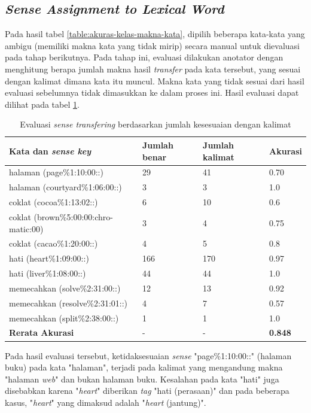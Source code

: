 \subsection{\textit{Sense Assignment to Lexical Word}}

Pada hasil tabel \ref{table:akuras-kelas-makna-kata}, dipilih beberapa kata-kata yang ambigu (memiliki makna kata yang tidak mirip) secara manual untuk dievaluasi pada tahap berikutnya. Pada tahap ini, evaluasi dilakukan anotator dengan menghitung berapa jumlah makna hasil \textit{transfer} pada kata tersebut, yang sesuai dengan kalimat dimana kata itu muncul. Makna kata yang tidak sesuai dari hasil evaluasi sebelumnya tidak dimasukkan ke dalam proses ini. Hasil evaluasi dapat dilihat pada tabel \ref{table:evaluasi-sense-transfer-2}.

\begin{table}
	\centering
	\caption{Evaluasi \textit{sense transfering} berdasarkan jumlah kesesuaian dengan kalimat}
	\label{table:evaluasi-sense-transfer-2}
	\begin{tabular}{|p{4cm}|p{2.85cm}|p{2.85cm}|p{1.4cm}|}
		\hline
		\textbf{Kata dan \textit{sense key}} & \textbf{Jumlah benar} & \textbf{Jumlah kalimat} & \textbf{Akurasi}
		\\ \hline
		halaman (page\%1:10:00::) & 29 & 41 & 0.70 \\ \hline
		halaman (courtyard\%1:06:00::) & 3 & 3 & 1.0 \\ \hline
		coklat (cocoa\%1:13:02::) & 6 & 10 & 0.6 \\ \hline
		coklat (brown\%5:00:00:chro-matic:00) & 3 & 4 & 0.75 \\ \hline
		coklat (cacao\%1:20:00::) & 4 & 5 & 0.8 \\ \hline
		hati (heart\%1:09:00::) & 166 & 170 & 0.97 \\ \hline
		hati (liver\%1:08:00::) & 44 & 44 & 1.0 \\ \hline
		memecahkan (solve\%2:31:00::) & 12 & 13 & 0.92 \\ \hline
		memecahkan (resolve\%2:31:01::) & 4 & 7 & 0.57 \\ \hline
		memecahkan (split\%2:38:00::) & 1 & 1 & 1.0 \\ \hline
		\hline
		\textbf{Rerata Akurasi} & - & - & \textbf{0.848} \\ \hline
	\end{tabular}
\end{table}

Pada hasil evaluasi tersebut, ketidaksesuaian \textit{sense} "page\%1:10:00::" (halaman buku) pada kata "halaman", terjadi pada kalimat yang mengandung makna "halaman \textit{web}" dan bukan halaman buku. Kesalahan pada kata "hati" juga disebabkan karena "\textit{heart}" diberikan \textit{tag} "hati (perasaan)" dan pada beberapa kasus, "\textit{heart}" yang dimaksud adalah "\textit{heart} (jantung)".
 
